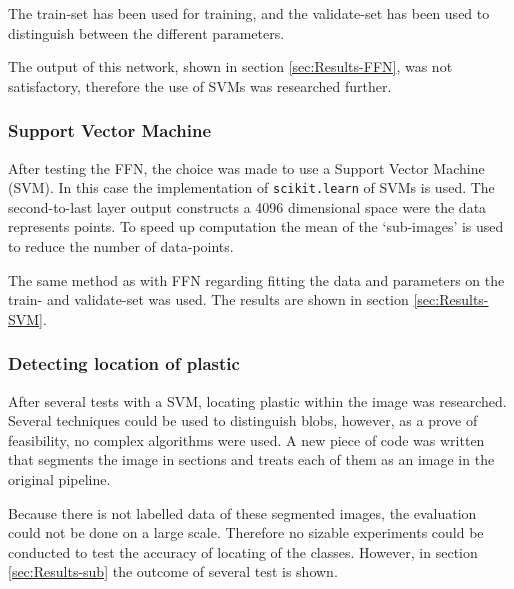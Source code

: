 The train-set has been used for training, and the validate-set has been used to distinguish between the different parameters.

The output of this network, shown in section \ref{sec:Results-FFN}, was not satisfactory, therefore the use of SVMs was researched further.

\subsubsection{Support Vector Machine}
\label{sec:Method-SVM}
After testing the FFN, the choice was made to use a Support Vector Machine (SVM).
In this case the implementation of \texttt{scikit.learn} of SVMs is used.
The second-to-last layer output constructs a 4096 dimensional space were the data represents points.
To speed up computation the mean of the `sub-images' is used to reduce the number of data-points.

The same method as with FFN regarding fitting the data and parameters on the train- and validate-set was used.
The results are shown in section \ref{sec:Results-SVM}.

\subsubsection{Detecting location of plastic}
\label{sec:Method-sub}
After several tests with a SVM, locating plastic within the image was researched.
Several techniques could be used to distinguish blobs, however, as a prove of feasibility, no complex algorithms were used.
A new piece of code was written that segments the image in sections and treats each of them as an image in the original pipeline.

Because there is not labelled data of these segmented images, the evaluation could not be done on a large scale.
Therefore no sizable experiments could be conducted to test the accuracy of locating of the classes.
However, in section \ref{sec:Results-sub} the outcome of several test is shown.

\fi